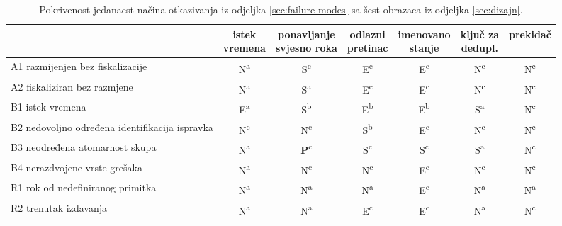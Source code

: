 \begin{table}[H]
\centering
\caption[Pokrivenost načina otkazivanja obrascima]{Pokrivenost jedanaest načina
otkazivanja iz odjeljka \ref{sec:failure-modes} sa šest obrazaca iz
odjeljka \ref{sec:dizajn}.}
\label{tab:matrica}
\footnotesize
\setlength{\tabcolsep}{3.5pt}
\begin{tabular}{@{}p{}cccccc@{}}
\toprule
& \parbox{0.0880\textwidth}{\centering istek\\vremena}
& \parbox{0.1210\textwidth}{\centering ponavljanje\\svjesno roka}
& \parbox{0.0938\textwidth}{\centering odlazni\\pretinac}
& \parbox{0.1110\textwidth}{\centering imenovano\\stanje}
& \parbox{0.0875\textwidth}{\centering ključ za\\dedupl.}
& \parbox{0.0890\textwidth}{\centering prekidač} \\
\midrule
A1 razmijenjen bez fiskalizacije & N\textsuperscript{a} & S\textsuperscript{c} & E\textsuperscript{c} & E\textsuperscript{c} & N\textsuperscript{c} & N\textsuperscript{c} \\
A2 fiskaliziran bez razmjene     & N\textsuperscript{a} & S\textsuperscript{a} & E\textsuperscript{c} & E\textsuperscript{c} & N\textsuperscript{c} & N\textsuperscript{c} \\
\addlinespace
B1 istek vremena                 & E\textsuperscript{a} & S\textsuperscript{b} & E\textsuperscript{b} & E\textsuperscript{b} & S\textsuperscript{a} & N\textsuperscript{c} \\
B2 nedovoljno određena identifikacija ispravka & N\textsuperscript{c} & N\textsuperscript{c} & S\textsuperscript{b} & E\textsuperscript{c} & N\textsuperscript{c} & N\textsuperscript{c} \\
B3 neodređena atomarnost skupa   & N\textsuperscript{a} & \textbf{P}\textsuperscript{c} & S\textsuperscript{c} & S\textsuperscript{c} & S\textsuperscript{a} & N\textsuperscript{c} \\
B4 nerazdvojene vrste grešaka             & N\textsuperscript{a} & N\textsuperscript{c} & N\textsuperscript{c} & E\textsuperscript{c} & N\textsuperscript{c} & N\textsuperscript{c} \\
\addlinespace
R1 rok od nedefiniranog primitka & N\textsuperscript{a} & N\textsuperscript{a} & N\textsuperscript{a} & E\textsuperscript{c} & N\textsuperscript{a} & N\textsuperscript{a} \\
R2 trenutak izdavanja            & N\textsuperscript{a} & N\textsuperscript{a} & E\textsuperscript{c} & E\textsuperscript{c} & N\textsuperscript{a} & N\textsuperscript{c} \\

\end{tabular}
\end{table}
